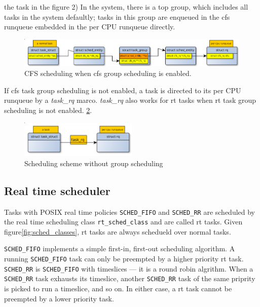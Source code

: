 the task in the figure 2) In the system, there is a top group, which includes
all tasks in the system defaultly; tasks in this group are enqueued in the
cfs runqueue embedded in the per CPU runqueue directly.
\begin{figure}[htbp]
        \centering
        \includegraphics[width=\textwidth]{images/cfs_scheduling_scheme_tg}
        \caption{CFS scheduling when cfs group scheduling is enabled.}
        \label{fig:cfs_scheme_tg}
\end{figure}

If cfs task group scheduling is not enabled, a task is directed to its 
per CPU runqueue by a \emph{task\_rq} marco. \emph{task\_rq} also works 
for rt tasks when rt task group scheduling is not enabled.
\ref{fig:sched_scheme_no_tg}.
\begin{figure}[htbp]
        \centering
        \includegraphics[height=0.1\textheight,width=0.5\textwidth]{images/scheduling_scheme_no_tg}
        \caption{Scheduling scheme without group scheduling}
        \label{fig:sched_scheme_no_tg}
\end{figure}

\subsection{Real time scheduler\label{sec:LinuxSched_rt}}
Tasks with POSIX real time policies \texttt{SCHED\_FIFO} and \texttt{SCHED\_RR}
are scheduled by the real time scheduling class \texttt{rt\_sched\_class} and
are called rt tasks. Given figure\ref{fig:sched_classes}, rt tasks are always
schedueld over normal tasks. 

\texttt{SCHED\_FIFO} implements a simple first-in, first-out scheduling 
algorithm. A running \texttt{SCHED\_FIFO} task can only be preempted by a 
higher priority rt task. \texttt{SCHED\_RR} is \texttt{SCHED\_FIFO} with 
timeslices --- it is a round robin algrithm. When a \texttt{SCHED\_RR}
task exhausts its timeslice, another \texttt{SCHED\_RR} task of the same
priprity is picked to run a timeslice, and so on. In either case, a rt task
cannot be preempted by a lower priority task.

